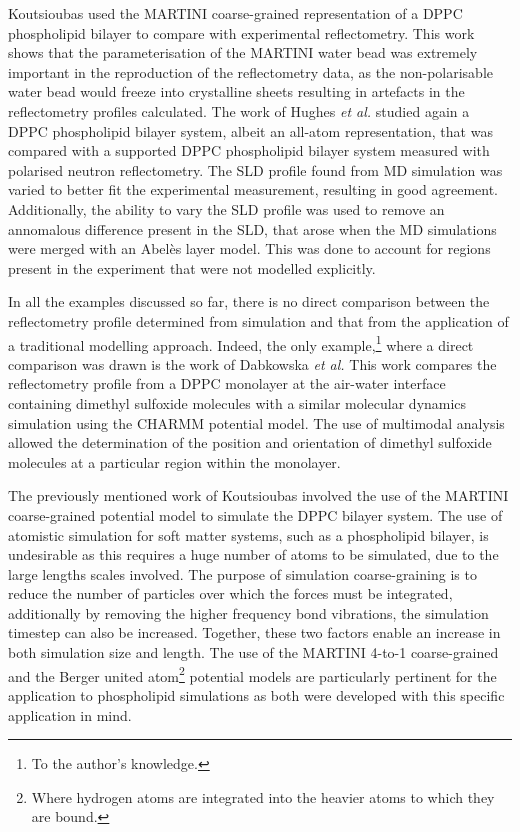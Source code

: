 Koutsioubas used the MARTINI coarse-grained representation of a DPPC phospholipid bilayer to compare with experimental reflectometry.\autocite{koutsioubas_combined_2016}
This work shows that the parameterisation of the MARTINI water bead was extremely important in the reproduction of the reflectometry data, as the non-polarisable water bead would freeze into crystalline sheets resulting in artefacts in the reflectometry profiles calculated.
The work of Hughes \emph{et al.} studied again a DPPC phospholipid bilayer system,\autocite{hughes_interpretation_2016} albeit an all-atom representation, that was compared with a supported DPPC phospholipid bilayer system measured with polarised neutron reflectometry.
The SLD profile found from MD simulation was varied to better fit the experimental measurement, resulting in good agreement.
Additionally, the ability to vary the SLD profile was used to remove an annomalous difference present in the SLD, that arose when the MD simulations were merged with an Abel\`{e}s layer model.
This was done to account for regions present in the experiment that were not modelled explicitly.

In all the examples discussed so far, there is no direct comparison between the reflectometry profile determined from simulation and that from the application of a traditional modelling approach.
Indeed, the only example,\footnote{To the author's knowledge.} where a direct comparison was drawn is the work of Dabkowska \emph{et al.}\autocite{dabkowska_modulation_2014}
This work compares the reflectometry profile from a DPPC monolayer at the air-water interface containing dimethyl sulfoxide molecules with a similar molecular dynamics simulation using the CHARMM potential model.
The use of multimodal analysis allowed the determination of the position and orientation of dimethyl sulfoxide molecules at a particular region within the monolayer.

The previously mentioned work of Koutsioubas involved the use of the MARTINI coarse-grained potential model to simulate the DPPC bilayer system.\autocite{koutsioubas_combined_2016}
The use of atomistic simulation for soft matter systems, such as a phospholipid bilayer, is undesirable as this requires a huge number of atoms to be simulated, due to the large lengths scales involved.
The purpose of simulation coarse-graining is to reduce the number of particles over which the forces must be integrated, additionally by removing the higher frequency bond vibrations, the simulation timestep can also be increased.\autocite{pluhackova_biomembranes_2015}
Together, these two factors enable an increase in both simulation size and length.
The use of the MARTINI 4-to-1 coarse-grained and the Berger united atom\footnote{Where hydrogen atoms are integrated into the heavier atoms to which they are bound.} potential models are particularly pertinent for the application to phospholipid simulations as both were developed with this specific application in mind.\autocite{marrink_martini_2007,berger_molecular_1997}


